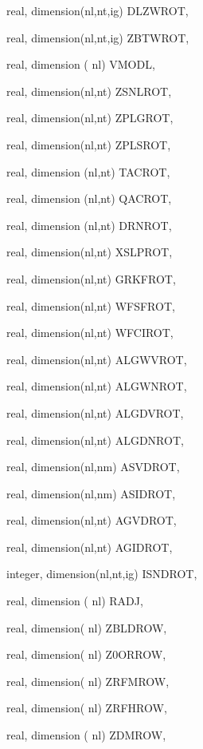 {\begin{DoxyParamCaption}
\item[{real, dimension(nl,nt,ig)}]{D\+L\+Z\+W\+R\+O\+T, }
\item[{real, dimension(nl,nt,ig)}]{Z\+B\+T\+W\+R\+O\+T, }
\item[{real, dimension  ( nl)}]{V\+M\+O\+D\+L, }
\item[{real, dimension(nl,nt)}]{Z\+S\+N\+L\+R\+O\+T, }
\item[{real, dimension(nl,nt)}]{Z\+P\+L\+G\+R\+O\+T, }
\item[{real, dimension(nl,nt)}]{Z\+P\+L\+S\+R\+O\+T, }
\item[{real, dimension (nl,nt)}]{T\+A\+C\+R\+O\+T, }
\item[{real, dimension (nl,nt)}]{Q\+A\+C\+R\+O\+T, }
\item[{real, dimension (nl,nt)}]{D\+R\+N\+R\+O\+T, }
\item[{real, dimension(nl,nt)}]{X\+S\+L\+P\+R\+O\+T, }
\item[{real, dimension(nl,nt)}]{G\+R\+K\+F\+R\+O\+T, }
\item[{real, dimension(nl,nt)}]{W\+F\+S\+F\+R\+O\+T, }
\item[{real, dimension(nl,nt)}]{W\+F\+C\+I\+R\+O\+T, }
\item[{real, dimension(nl,nt)}]{A\+L\+G\+W\+V\+R\+O\+T, }
\item[{real, dimension(nl,nt)}]{A\+L\+G\+W\+N\+R\+O\+T, }
\item[{real, dimension(nl,nt)}]{A\+L\+G\+D\+V\+R\+O\+T, }
\item[{real, dimension(nl,nt)}]{A\+L\+G\+D\+N\+R\+O\+T, }
\item[{real, dimension(nl,nm)}]{A\+S\+V\+D\+R\+O\+T, }
\item[{real, dimension(nl,nm)}]{A\+S\+I\+D\+R\+O\+T, }
\item[{real, dimension(nl,nt)}]{A\+G\+V\+D\+R\+O\+T, }
\item[{real, dimension(nl,nt)}]{A\+G\+I\+D\+R\+O\+T, }
\item[{integer, dimension(nl,nt,ig)}]{I\+S\+N\+D\+R\+O\+T, }
\item[{real, dimension   ( nl)}]{R\+A\+D\+J, }
\item[{real, dimension( nl)}]{Z\+B\+L\+D\+R\+O\+W, }
\item[{real, dimension( nl)}]{Z0\+O\+R\+R\+O\+W, }
\item[{real, dimension( nl)}]{Z\+R\+F\+M\+R\+O\+W, }
\item[{real, dimension( nl)}]{Z\+R\+F\+H\+R\+O\+W, }
\item[{real, dimension ( nl)}]{Z\+D\+M\+R\+O\+W, }

\end{DoxyParamCaption}}
